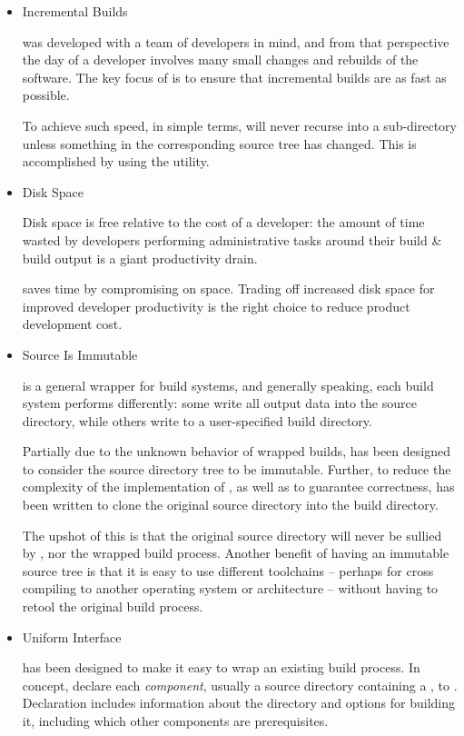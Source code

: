\begin{itemize}
\item Incremental Builds

  \lmsbw was developed with a team of developers in mind, and from that
  perspective the day of a developer involves many small changes and
  rebuilds of the software.  The key focus of \lmsbw is to ensure that
  incremental builds are as fast as possible.

  To achieve such speed, in simple terms, \lmsbw will never recurse
  into a sub-directory unless something in the corresponding source
  tree has changed.  This is accomplished by using the \mtree utility.

\item Disk Space

  Disk space is free relative to the cost of a developer: the amount
  of time wasted by developers performing administrative tasks around
  their build \& build output is a giant productivity drain.

  \lmsbw saves time by compromising on space.  Trading off increased
  disk space for improved developer productivity is the right choice
  to reduce product development cost.

\item Source Is Immutable

  \lmsbw is a general wrapper for build systems, and generally
  speaking, each build system performs differently: some write all
  output data into the source directory, while others write to a
  user-specified build directory.

  Partially due to the unknown behavior of wrapped builds, \lmsbw has
  been designed to consider the source directory tree to be immutable.
  Further, to reduce the complexity of the implementation of \lmsbw,
  as well as to guarantee correctness, \lmsbw has been written to
  clone the original source directory into the build directory.

  The upshot of this is that the original source directory will never
  be sullied by \lmsbw, nor the wrapped build process.  Another
  benefit of having an immutable source tree is that it is easy to use
  different toolchains -- perhaps for cross compiling to another
  operating system or architecture -- without having to retool the
  original build process.

\item Uniform Interface

  \lmsbw has been designed to make it easy to wrap an existing build
  process.  In concept, declare each \emph{component}, usually a
  source directory containing a \makefile, to \lmsbw.  Declaration
  includes information about the directory and options for building
  it, including which other components are prerequisites.


\end{itemize}
